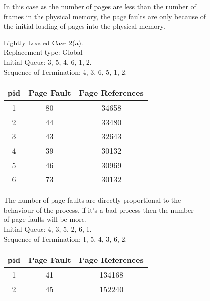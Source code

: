 \documentclass[a4paper,12pt]{article}
\begin{document}
\begin{enumerate}
      In this case as the number of pages are less than the number of\\
      frames in the physical memory, the page faults are only because of\\
      the initial loading of pages into the physical memory.
    \item[Lightly Loaded]
         Case 2(a):\\
         Replacement type: Global\\
         Initial Queue: 3, 5, 4, 6, 1, 2.\\
         Sequence of Termination: 4, 3, 6, 5, 1, 2.\\
         \begin{table}[h!]
           \begin{center}
             \begin{tabular}{c|c|c}
             \textbf{pid} & \textbf{Page Fault} & \textbf{Page References} \\
             \hline
             1   & 80   & 34658 \\
             2   & 44   & 33480 \\
             3   & 43   & 32643 \\
             4   & 39   & 30132 \\
             5   & 46   & 30969 \\
             6   & 73   & 30132 \\
             \end{tabular}
           \end{center}
         \end{table}
         The number of page faults are directly proportional to the\\
         behaviour of the process, if it's a bad process then the number\\
         of page faults will be more.\\
         Initial Queue: 4, 3, 5, 2, 6, 1.\\
         Sequence of Termination: 1, 5, 4, 3, 6, 2.\\
         \begin{table}[h!]
           \begin{center}
             \begin{tabular}{c|c|c}
             \textbf{pid} & \textbf{Page Fault} & \textbf{Page References} \\
             \hline
             1   & 41   & 134168 \\
             2   & 45   & 152240 \\

\end{tabular}
\end{center}
\end{table}
\end{enumerate}
\end{document}
